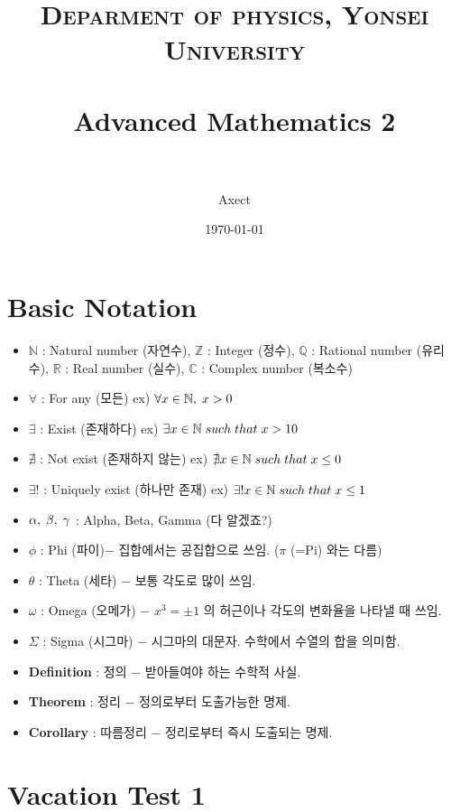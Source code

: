 \documentclass[paper=a4, fontsize=11pt]{scrartcl} %
\title{	
\normalfont \normalsize 
\textsc{Deparment of physics, Yonsei University} \\ [25pt] %
\horrule{0.5pt} \\[0.4cm] %
\huge Advanced Mathematics 2\\ %
\horrule{2pt} \\[0.5cm] %
}
\author{Axect} %
\date{\normalsize\today} %
\numberwithin{equation}{section} %
\numberwithin{figure}{section} %
\numberwithin{table}{section} %
\theoremstyle{plain}
\newcommand{\Com}{,\Hs}
\newcommand{\Hs}{\hspace{0.1cm}}
\newcommand{\HS}{\hspace{0.5cm}}
\newcommand{\VS}{\vspace{0.3cm}}
\newcommand{\N}{\mathbb{N}}
\newcommand{\Z}{\mathbb{Z}}
\newcommand{\Q}{\mathbb{Q}}
\newcommand{\R}{\mathbb{R}}
\newcommand{\C}{\mathbb{C}}
\begin{document}
\maketitle %


\section{Basic Notation}
\VS\VS
\begin{itemize}
 \item $\N$ : Natural number (자연수), $\Z$ : Integer (정수), $\Q$ : Rational number (유리수), \newline
 $\R$ : Real number (실수), $\C$ : Complex number (복소수)
 \item $\forall$ : For any (모든) \HS ex) $\forall x \in \N \Com x>0$
 \item $\exists$ : Exist (존재하다) \HS ex) $\exists x \in \N \Hs such \Hs that \Hs x>10$
 \item $\nexists$ : Not exist (존재하지 않는) \HS ex) $\nexists x \in \N \Hs such \Hs that\Hs x \leq 0$
 \item $\exists !$ : Uniquely exist (하나만 존재) \HS ex) $\exists ! x \in \N \Hs such \Hs that \Hs x \leq 1$
 \item $\alpha\Com\beta\Com\gamma$ : Alpha, Beta, Gamma (다 알겠죠?)
 \item $\phi$ : Phi (파이)$ -$ 집합에서는 공집합으로 쓰임. ($\pi$ (=Pi) 와는 다름)
 \item $\theta$ : Theta (세타) $-$ 보통 각도로 많이 쓰임.
 \item $\omega$ : Omega (오메가) $-$ \Hs $x^3 = \pm 1$ 의 허근이나 각도의 변화율을 나타낼 때 쓰임.
 \item $\Sigma$ : Sigma (시그마) $-$ 시그마의 대문자. 수학에서 수열의 합을 의미함.
 \item \textbf{Definition} : 정의 $-$ 받아들여야 하는 수학적 사실.
 \item \textbf{Theorem} : 정리 $-$ 정의로부터 도출가능한 명제.
 \item \textbf{Corollary} : 따름정리 $-$ 정리로부터 즉시 도출되는 명제. 
\end{itemize}

\pagebreak
\section{Vacation Test 1}
\VS
\end{document}
